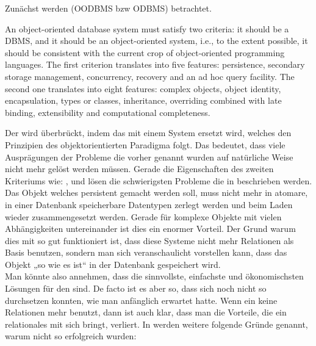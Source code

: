 Zunächst werden  (OODBMS bzw ODBMS) betrachtet. %
\begin{definition}[ODBMS]
An object-oriented database system must satisfy two criteria: it should be a DBMS, and it should be an object-oriented system, i.e., to the extent possible, it should be consistent with the current crop of object-oriented programming languages. The first criterion translates into five features: persistence, secondary storage management, concurrency, recovery and an ad hoc query facility. The second one translates into eight features: complex objects, object identity, encapsulation, types or classes, inheritance, overriding combined with late binding, extensibility and computational completeness. \cite{odbms-manifesto}
\end{definition}
\noindent Der \IM wird überbrückt, indem das \RDBMS mit einem System ersetzt wird, welches den Prinzipien des objektorientierten Paradigma folgt. Das bedeutet, dass viele Ausprägungen der Probleme die vorher genannt wurden auf natürliche Weise nicht mehr gelöst werden müssen. Gerade die Eigenschaften des zweiten Kriteriums wie: ,  und  lösen die schwierigsten Probleme die in \cite[S. 38]{classification} beschrieben werden. Das Objekt welches persistent gemacht werden soll, muss nicht mehr in atomare, in einer Datenbank speicherbare Datentypen zerlegt werden und beim Laden wieder zusammengesetzt werden. Gerade für komplexe Objekte mit vielen Abhängigkeiten untereinander ist dies ein enormer Vorteil. Der Grund warum dies mit \ODBMSs so gut funktioniert ist, dass diese Systeme nicht mehr Relationen als Basis benutzen, sondern man sich veranschaulicht vorstellen kann, dass das Objekt „so wie es ist“ in der Datenbank gespeichert wird.\\
Man könnte also annehmen, dass \ODBMSs die sinnvollste, einfachste und ökonomischsten Lösungen für den \IM sind. De facto ist es aber so, dass \ODBMSs sich noch nicht so durchsetzen konnten, wie man anfänglich erwartet hatte. Wenn ein \ODBMS keine Relationen mehr benutzt, dann ist auch klar, dass man die Vorteile, die ein relationales \DBMS mit sich bringt, verliert. In \cite{what-ever-happened-to-odbmss} werden weitere folgende Gründe genannt, warum \ODBMS nicht so erfolgreich wurden:
